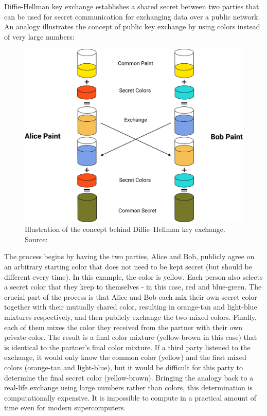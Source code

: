 Diffie-Hellman key exchange establishes a shared secret between two parties that can be used for secret communication
for exchanging data over a public network.
An analogy illustrates the concept of public key exchange by using colors instead of very large numbers:
\begin{figure}[H]
    \centering
    \includegraphics[width=1\textwidth]{Pictures/Diffie-Hellman}
    \caption{Illustration of the concept behind Diffie–Hellman key exchange. Source: }\label{fig:figure4}
\end{figure}
The process begins by having the two parties, Alice and Bob, publicly agree on an arbitrary starting color that does
not need to be kept secret (but should be different every time).
In this example, the color is yellow.
Each person also selects a secret color that they keep to themselves - in this case, red and blue-green.
The crucial part of the process is that Alice and Bob each mix their own secret color together with their mutually
shared color, resulting in orange-tan and light-blue mixtures respectively, and then publicly exchange the two mixed colors.
Finally, each of them mixes the color they received from the partner with their own private color.
The result is a final color mixture (yellow-brown in this case) that is identical to the partner's final color mixture.
If a third party listened to the exchange, it would only know the common color (yellow) and the first mixed colors
(orange-tan and light-blue), but it would be difficult for this party to determine the final secret color (yellow-brown).
Bringing the analogy back to a real-life exchange using large numbers rather than colors, this determination is
computationally expensive.
It is impossible to compute in a practical amount of time even for modern supercomputers.

